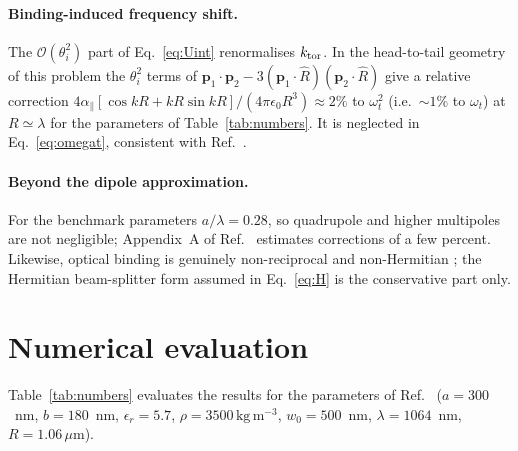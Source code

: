 \documentclass[11pt,a4paper]{article}
\newcommand{\unit}[1]{\,\mathrm{#1}}
\begin{document}
\paragraph{Binding-induced frequency shift.}
The $\mathcal O(\theta_i^{2})$ part of Eq.~\eqref{eq:Uint} renormalises
$k_{\rm tor}$.  In the head-to-tail geometry of this problem the
$\theta_i^{2}$ terms of $\mathbf p_1\cdot\mathbf p_2-3(\mathbf p_1\cdot\hat R)
(\mathbf p_2\cdot\hat R)$ give a relative correction
$4\alpha_{\parallel}\left[\cos kR+kR\sin kR\right]/(4\pi\epsilon_0R^{3})
\approx2\%$ to $\omega_t^{2}$ (i.e.\ $\sim1\%$ to $\omega_t$) at $R\simeq\lambda$
for the parameters of Table~\ref{tab:numbers}.  It is neglected in
Eq.~\eqref{eq:omegat}, consistent with Ref.~\cite{Zhang2025}.

\paragraph{Beyond the dipole approximation.}
For the benchmark parameters $a/\lambda=0.28$, so quadrupole and higher
multipoles are not negligible; Appendix~A of Ref.~\cite{Zhang2025} estimates
corrections of a few percent.  Likewise, optical binding is genuinely
non-reciprocal and non-Hermitian \cite{Rieser2022,Rudolph2024}; the Hermitian
beam-splitter form assumed in Eq.~\eqref{eq:H} is the conservative part only.

\section{Numerical evaluation}

Table~\ref{tab:numbers} evaluates the results for the parameters of
Ref.~\cite{Zhang2025} ($a=300$~nm, $b=180$~nm, $\epsilon_r=5.7$,
$\rho=3500\unit{kg\,m^{-3}}$, $w_0=500$~nm, $\lambda=1064$~nm, $R=1.06\,\mu$m).
\end{document}
